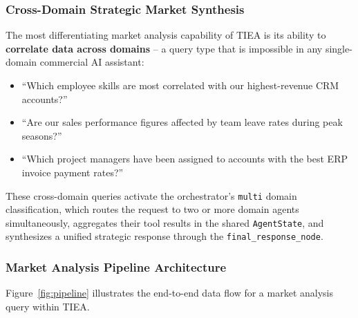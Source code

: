 \documentclass[12pt,a4paper]{report}
\begin{document}
\subsubsection{Cross-Domain Strategic Market Synthesis}

The most differentiating market analysis capability of TIEA is its ability to \textbf{correlate
data across domains} -- a query type that is impossible in any single-domain commercial AI
assistant:

\begin{insightbox}
\begin{itemize}[leftmargin=1.2em]
  \item ``Which employee skills are most correlated with our highest-revenue CRM accounts?''
  \item ``Are our sales performance figures affected by team leave rates during peak seasons?''
  \item ``Which project managers have been assigned to accounts with the best ERP invoice payment
    rates?''
\end{itemize}
\end{insightbox}

These cross-domain queries activate the orchestrator's \texttt{multi} domain classification, which
routes the request to two or more domain agents simultaneously, aggregates their tool results in the
shared \texttt{AgentState}, and synthesizes a unified strategic response through the
\texttt{final\_response\_node}.

\subsubsection{Market Analysis Pipeline Architecture}

Figure~\ref{fig:pipeline} illustrates the end-to-end data flow for a market analysis query within
TIEA.
\end{document}
